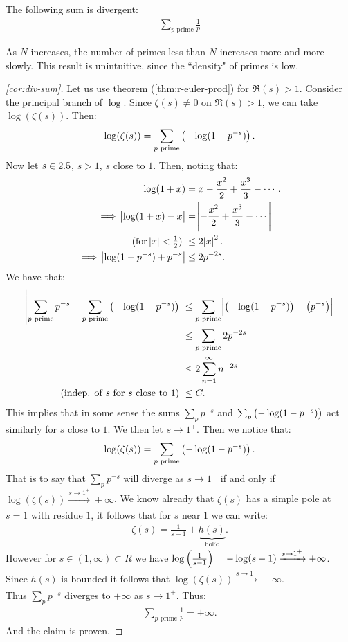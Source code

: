 \begin{corollary}\label{cor:div-sum} The following sum is divergent:
\begin{align*}
    \sum_{p \text{ prime}} \frac{1}{p}
\end{align*}
\end{corollary}
\begin{note}
As $N$ increases, the number of primes less than $N$ increases more and more slowly. This result is unintuitive, since the ``density" of primes is low.
\end{note}
\begin{proof}[\ref{cor:div-sum}]
Let us use theorem (\ref{thm:r-euler-prod}) for $\Re(s) > 1$. Consider the principal branch of $\log$. Since $\zeta(s) \neq 0$ on $\Re(s) > 1$, we can take $\log(\zeta(s))$. Then:
\begin{align*}
    \log(\zeta(s)) = \sum_{p \text{ prime}} \left( - \log(1-p^{-s}) \right).
\end{align*}
Now let $s \in 2.5$, $s> 1$, $s$ close to $1$. Then, noting that:
\begin{align*}
\log(1+x) &= x - \frac{x^2}{2} + \frac{x^3}{3} - \cdots.\\
\implies \abs{\log(1+x) - x} &= \abs{ - \frac{x^2}{2} + \frac{x^3}{3} - \cdots } \\
\text{(for $\abs{x} < \tfrac{1}{2}$) }&\leq 2 \abs{x}^2.\\
\implies \abs{\log(1-p^{-s}) +p^{-s}} &\leq 2 p^{-2s}.
\end{align*}
We have that:
\begin{align*}
    \abs{\sum_{p \text{ prime}} p^{-s} - \sum_{p \text{ prime}} \left( - \log(1-p^{-s}) \right) } &\leq \sum_{p \text{ prime}} \abs{\left( - \log(1-p^{-s}) \right) - \left( p^{-s} \right)}\\ &\leq  \sum_{p \text{ prime}} 2 p^{-2s}\\
    &\leq 2 \sum_{n=1}^\infty n^{-2s}\\
    \text{(indep. of $s$ for $s$ close to $1$) } & \leq C.
\end{align*}
This implies that in some sense the sums $\sum_p p^{-s}$ and $\sum_p \left( - \log(1-p^{-s}) \right)$ act similarly for $s$ close to $1$. We then let $s \to 1^+$. Then we notice that:
\begin{align*}
    \log(\zeta(s)) = \sum_{p \text{ prime}} \left( - \log(1-p^{-s}) \right).
\end{align*}
That is to say that $\sum_p p^{-s}$ will diverge as $s \to 1^+$ if and only if $\log( \zeta(s)) \xrightarrow[]{s \to 1^+} + \infty$. We know already that $\zeta (s)$ has a simple pole at $s=1$ with residue $1$, it follows that for $s$ near $1$ we can write:
\begin{align*}
    \zeta(s) = \frac{1}{s-1} + \underbrace{h(s)}_{\text{hol'c}}.
\end{align*}
However for $s \in (1,\infty) \subset 
R$ we have $\log\left( \frac{1}{s-1} \right) = - \log(s-1) \xrightarrow[]{s \to 1^+} +\infty$. Since $h(s)$ is bounded it follows that $\log( \zeta(s)) \xrightarrow[]{s \to 1^+} + \infty$.\\

Thus $\sum_p p^{-s}$ diverges to $+ \infty$ as $s \to 1^+$. Thus:
\begin{align*}
    \sum_{p \text{ prime}} \frac{1}{p} = + \infty.
\end{align*}
And the claim is proven.
\end{proof}


